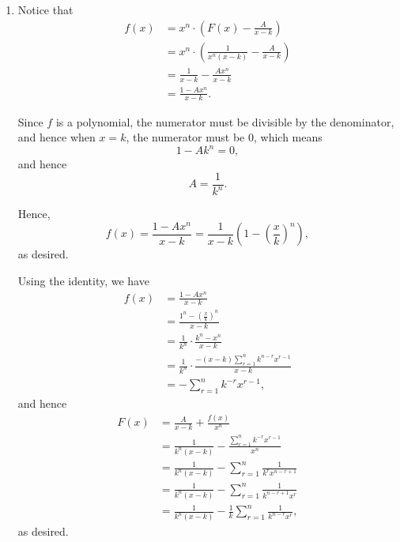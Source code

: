 \begin{enumerate}
    \item Notice that
          \begin{align*}
              f(x) & = x^n \cdot \left(F(x) - \frac{A}{x - k}\right)                  \\
                   & = x^n \cdot \left(\frac{1}{x^n (x - k)} - \frac{A}{x - k}\right) \\
                   & = \frac{1}{x - k} - \frac{A x^n}{x - k}                          \\
                   & = \frac{1 - A x^n}{x - k}.
          \end{align*}

          Since \(f\) is a polynomial, the numerator must be divisible by the denominator, and hence when \(x = k\), the numerator must be \(0\), which means
          \[
              1 - A k^n = 0,
          \]
          and hence
          \[
              A = \frac{1}{k^n}.
          \]

          Hence,
          \[
              f(x) = \frac{1 - A x^n}{x - k} = \frac{1}{x - k} \left(1 - \left(\frac{x}{k}\right)^n\right),
          \]
          as desired.

          Using the identity, we have
          \begin{align*}
              f(x) & = \frac{1 - A x^n}{x - k}                                                         \\
                   & = \frac{1^n - \left(\frac{x}{k}\right)^n}{x - k}                                  \\
                   & = \frac{1}{k^n} \cdot \frac{k^n - x^n}{x - k}                                     \\
                   & = \frac{1}{k^n} \cdot \frac{-(x - k) \sum_{r = 1}^{n} k^{n - r} x^{r - 1}}{x - k} \\
                   & = - \sum_{r = 1}^{n} k^{-r} x^{r - 1},
          \end{align*}
          and hence
          \begin{align*}
              F(x) & = \frac{A}{x - k} + \frac{f(x)}{x^n}                                            \\
                   & = \frac{1}{k^n (x - k)} - \frac{\sum_{r = 1}^{n} k^{-r} x^{r - 1}}{x^n}         \\
                   & = \frac{1}{k^n (x - k)} - \sum_{r = 1}^{n} \frac{1}{k^r x^{n - r + 1}}          \\
                   & = \frac{1}{k^n (x - k)} - \sum_{r = 1}^{n} \frac{1}{k^{n - r + 1} x^r}          \\
                   & = \frac{1}{k^n (x - k)} - \frac{1}{k} \sum_{r = 1}^{n} \frac{1}{k^{n - r} x^r},
          \end{align*}
          as desired.


\end{enumerate}
